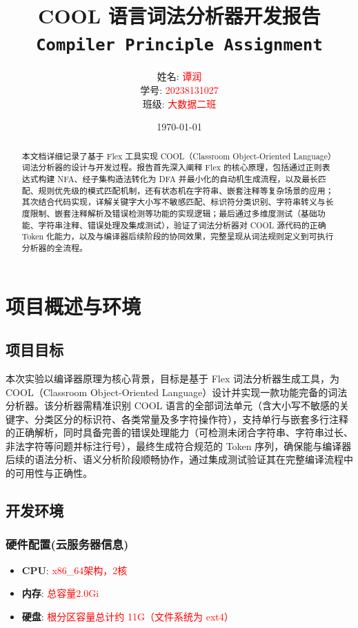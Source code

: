 \documentclass[twocolumn]{article}
\title{
    \vspace{-1cm} %
    \textbf{COOL 语言词法分析器开发报告} \\
    \large \texttt{Compiler Principle Assignment}
}
\author{
    姓名: \textcolor{red}{谭润} \\
    学号: \textcolor{red}{20238131027} \\
    班级: \textcolor{red}{大数据二班}
}
\date{\today}
\begin{document}
\maketitle
\thispagestyle{fancy} %

\begin{abstract}
\noindent
本文档详细记录了基于 Flex 工具实现 COOL（Classroom Object-Oriented Language）词法分析器的设计与开发过程。报告首先深入阐释 Flex 的核心原理，包括通过正则表达式构建 NFA、经子集构造法转化为 DFA 并最小化的自动机生成流程，以及最长匹配、规则优先级的模式匹配机制，还有状态机在字符串、嵌套注释等复杂场景的应用；其次结合代码实现，详解关键字大小写不敏感匹配、标识符分类识别、字符串转义与长度限制、嵌套注释解析及错误检测等功能的实现逻辑；最后通过多维度测试（基础功能、字符串注释、错误处理及集成测试），验证了词法分析器对 COOL 源代码的正确 Token 化能力，以及与编译器后续阶段的协同效果，完整呈现从词法规则定义到可执行分析器的全流程。
\end{abstract}

\section{项目概述与环境}
\subsection{项目目标}
本次实验以编译器原理为核心背景，目标是基于 Flex 词法分析器生成工具，为 COOL（Classroom Object-Oriented Language）设计并实现一款功能完备的词法分析器。该分析器需精准识别 COOL 语言的全部词法单元（含大小写不敏感的关键字、分类区分的标识符、各类常量及多字符操作符），支持单行与嵌套多行注释的正确解析，同时具备完善的错误处理能力（可检测未闭合字符串、字符串过长、非法字符等问题并标注行号），最终生成符合规范的 Token 序列，确保能与编译器后续的语法分析、语义分析阶段顺畅协作，通过集成测试验证其在完整编译流程中的可用性与正确性。
\subsection{开发环境}

\subsubsection{硬件配置(云服务器信息)}
\begin{itemize}
    \item \textbf{CPU}: \textcolor{red}{x86_64架构，2核}
    \item \textbf{内存}: \textcolor{red}{总容量2.0Gi}
    \item \textbf{硬盘}: \textcolor{red}{根分区容量总计约 11G（文件系统为 ext4）}
\end{itemize}
\end{document}
